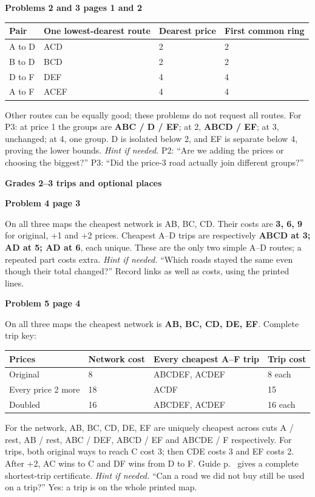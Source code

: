 \documentclass[11pt]{article}
\newcommand{\head}[1]{\par{\large\bfseries #1}\par\nobreak}
\newcommand{\sub}[1]{\par\textbf{#1}\par\nobreak}
\newcommand{\hint}[1]{\textit{Hint if needed.} #1}
\begin{document}
\sub{Problems 2 and 3 pages 1 and 2}\label{routes-groups}
\begin{center}\small
\begin{tabular}{llll}
Pair & One lowest-dearest route & Dearest price & First common ring\\\midrule
A to D & ACD & 2 & 2\\
B to D & BCD & 2 & 2\\
D to F & DEF & 4 & 4\\
A to F & ACEF & 4 & 4
\end{tabular}
\end{center}
Other routes can be equally good; these problems do not request all routes. For P3: at price 1 the groups are \textbf{ABC / D / EF}; at 2, \textbf{ABCD / EF}; at 3, unchanged; at 4, one group. D is isolated below 2, and EF is separate below 4, proving the lower bounds. \hint{P2: ``Are we adding the prices or choosing the biggest?'' P3: ``Did the price-3 road actually join different groups?''}

\bigskip
\head{Grades 2--3 trips and optional places}
\sub{Problem 4 page 3}\label{trip-key}
On all three maps the cheapest network is AB, BC, CD. Their costs are \textbf{3, 6, 9} for original, +1 and +2 prices. Cheapest A--D trips are respectively \textbf{ABCD at 3; AD at 5; AD at 6}, each unique. These are the only two simple A--D routes; a repeated part costs extra. \hint{``Which roads stayed the same even though their total changed?''} Record links as well as costs, using the printed lines.

\sub{Problem 5 page 4}\label{grid-key}
On all three maps the cheapest network is \textbf{AB, BC, CD, DE, EF}. Complete trip key:
\begin{center}\small
\begin{tabular}{llll}
Prices & Network cost & Every cheapest A--F trip & Trip cost\\\midrule
Original & 8 & ABCDEF, ACDEF & 8 each\\
Every price 2 more & 18 & ACDF & 15\\
Doubled & 16 & ABCDEF, ACDEF & 16 each
\end{tabular}
\end{center}
For the network, AB, BC, CD, DE, EF are uniquely cheapest across cuts A / rest, AB / rest, ABC / DEF, ABCD / EF and ABCDE / F respectively. For trips, both original ways to reach C cost 3; then CDE costs 3 and EF costs 2. After +2, AC wins to C and DF wins from D to F. Guide p.~\pageref{trip-certificate} gives a complete shortest-trip certificate. \hint{``Can a road we did not buy still be used on a trip?''} Yes: a trip is on the whole printed map.
\end{document}
